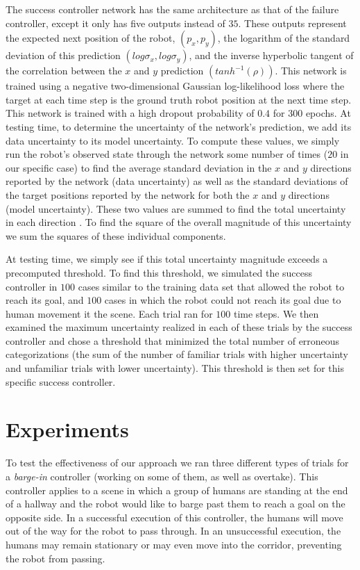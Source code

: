 \documentclass[letterpaper]{article}
\begin{document}
				The success controller network has the same architecture as that of the failure controller, except it only has five outputs instead of $35$. These outputs represent the expected next position of the robot, $(p_x, p_y)$, the logarithm of the standard deviation of this prediction $(log\sigma_x, log\sigma_y)$, and the inverse hyperbolic tangent of the correlation between the $x$ and $y$ prediction $(tanh^{-1}(\rho))$. This network is trained using a negative two-dimensional Gaussian log-likelihood loss where the target at each time step is the ground truth robot position at the next time step. This network is trained with a high dropout probability of $0.4$ for $300$ epochs. At testing time, to determine the uncertainty of the network's prediction, we add its data uncertainty to its model uncertainty. To compute these values, we simply run the robot's observed state through the network some number of times ($20$ in our specific case) to find the average standard deviation in the $x$ and $y$ directions reported by the network (data uncertainty) as well as the standard deviations of the target positions reported by the network for both the $x$ and $y$ directions (model uncertainty). These two values are summed to find the total uncertainty in each direction \cite{uncertaintyindeeplearning}. To find the square of the overall magnitude of this uncertainty we sum the squares of these individual components.
				
				At testing time, we simply see if this total uncertainty magnitude exceeds a precomputed threshold. To find this threshold, we simulated the success controller in $100$ cases similar to the training data set that allowed the robot to reach its goal, and $100$ cases in which the robot could not reach its goal due to human movement it the scene. Each trial ran for $100$ time steps. We then examined the maximum uncertainty realized in each of these trials by the success controller and chose a threshold that minimized the total number of erroneous categorizations (the sum of the number of familiar trials with higher uncertainty and unfamiliar trials with lower uncertainty). This threshold is then set for this specific success controller.
			
	\section{Experiments}
		To test the effectiveness of our approach we ran three different types of trials for a \textit{barge-in} controller (working on some of them, as well as overtake). This controller applies to a scene in which a group of humans are standing at the end of a hallway and the robot would like to barge past them to reach a goal on the opposite side. In a successful execution of this controller, the humans will move out of the way for the robot to pass through. In an unsuccessful execution, the humans may remain stationary or may even move into the corridor, preventing the robot from passing. 
		
\end{document}
